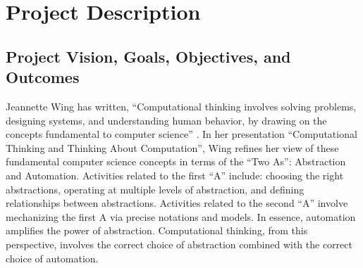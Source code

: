 
\renewcommand{\thepage} {C--\arabic{page}}

\renewcommand{\thesection} {C.\arabic{section}}
\setcounter{section}{0}

\section{Project Description}

\subsection{Project Vision, Goals, Objectives, and Outcomes}



Jeannette Wing has written, ``Computational thinking involves solving
problems, designing systems, and understanding human behavior, by drawing
on the concepts fundamental to computer science'' \citep{Wing06}.  In her
presentation ``Computational Thinking and Thinking About Computation'',
Wing refines her view of these fundamental computer science concepts in terms of 
the ``Two As'': Abstraction and Automation.  Activities
related to the first ``A'' include: choosing the right abstractions, operating
at multiple levels of abstraction, and defining relationships between
abstractions.  Activities related to the second ``A'' involve mechanizing the
first A via precise notations and models.  In essence, automation amplifies
the power of abstraction.  Computational thinking, from this perspective,
involves the correct choice of abstraction combined with the correct choice
of automation.

